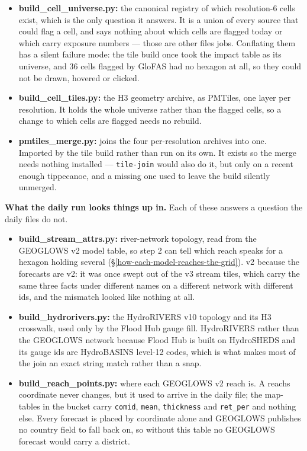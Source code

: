 \begin{itemize}
\item
  \textbf{build\_cell\_universe.py:} the canonical registry of which resolution-6 cells exist, which is the only question it answers. It is a union of every source that could flag a cell, and says nothing about which cells are flagged today or which carry exposure numbers --- those are other files\textquotesingle{} jobs. Conflating them has a silent failure mode: the tile build once took the impact table as its universe, and 36 cells flagged by GloFAS had no hexagon at all, so they could not be drawn, hovered or clicked.
\item
  \textbf{build\_cell\_tiles.py:} the H3 geometry archive, as PMTiles, one layer per resolution. It holds the whole universe rather than the flagged cells, so a change to which cells are flagged needs no rebuild.
\item
  \textbf{pmtiles\_merge.py:} joins the four per-resolution archives into one. Imported by the tile build rather than run on its own. It exists so the merge needs nothing installed --- \texttt{tile-join} would also do it, but only on a recent enough tippecanoe, and a missing one used to leave the build silently unmerged.
\end{itemize}

\textbf{What the daily run looks things up in.}
Each of these answers a question the daily files do not.

\begin{itemize}
\item
  \textbf{build\_stream\_attrs.py:} river-network topology, read from the GEOGLOWS v2 model table, so step 2 can tell which reach speaks for a hexagon holding several (\S\ref{how-each-model-reaches-the-grid}). v2 because the forecasts are v2: it was once swept out of the v3 stream tiles, which carry the same three facts under different names on a different network with different ids, and the mismatch looked like nothing at all.
\item
  \textbf{build\_hydrorivers.py:} the HydroRIVERS v10 topology and its H3 crosswalk, used only by the Flood Hub gauge fill. HydroRIVERS rather than the GEOGLOWS network because Flood Hub is built on HydroSHEDS and its gauge ids are HydroBASINS level-12 codes, which is what makes most of the join an exact string match rather than a snap.
\item
  \textbf{build\_reach\_points.py:} where each GEOGLOWS v2 reach is. A reach\textquotesingle s coordinate never changes, but it used to arrive in the daily file; the map-tables in the bucket carry \texttt{comid}, \texttt{mean}, \texttt{thickness} and \texttt{ret\_per} and nothing else. Every forecast is placed by coordinate alone and GEOGLOWS publishes no country field to fall back on, so without this table no GEOGLOWS forecast would carry a district.
\end{itemize}

